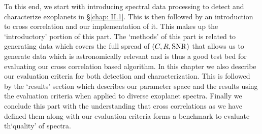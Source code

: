 To this end, we start with introducing spectral data processing to detect and characterize exoplanets in \S\ref{chap: II.1}.
This is then followed by an introduction to cross correlation and our implementation of it. 
This makes up the `introductory' portion of this part. 
The `methods' of this part is related to generating data which covers the full spread of $\left(C, R, \rm{SNR}\right)$\@
that allows us to generate data which is astronomically relevant and is thus a good test bed for evaluating our \@
cross correlation based algorithm.
In this chapter we also describe our evaluation criteria for both detection and characterization.
This is followed by the `results' section which describes our parameter space and the results using the evaluation criteria when applied\@
to diverse exoplanet spectra. 
Finally we conclude this part with the understanding that cross correlations as we have defined them along with our evaluation criteria forms a \@
benchmark to evaluate th`quality' of spectra.